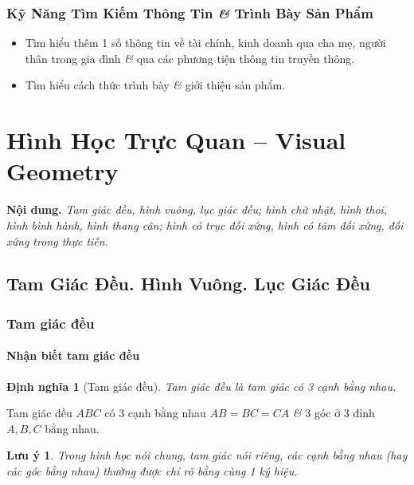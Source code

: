\documentclass{article}
\numberwithin{equation}{section}
\newtheorem{dinhnghia}{Định nghĩa}[section]
\newtheorem{luuy}{Lưu ý}[section]
\begin{document}
\subsubsection{Kỹ Năng Tìm Kiếm Thông Tin \textit{\&} Trình Bày Sản Phẩm}

\begin{itemize}
	\item Tìm hiểu thêm 1 số thông tin về tài chính, kinh doanh qua cha mẹ, người thân trong gia đình \textit{\&} qua các phương tiện thông tin truyền thông.
	\item Tìm hiểu cách thức trình bày \textit{\&} giới thiệu sản phẩm.
\end{itemize}


\section{Hình Học Trực Quan -- Visual Geometry}
\textbf{Nội dung.} \textit{Tam giác đều, hình vuông, lục giác đều; hình chữ nhật, hình thoi, hình bình hành, hình thang cân; hình có trục đối xứng, hình có tâm đối xứng, đối xứng trong thực tiễn}.

\subsection{Tam Giác Đều. Hình Vuông. Lục Giác Đều}

\subsubsection{Tam giác đều}

\paragraph{Nhận biết tam giác đều}
\begin{dinhnghia}[Tam giác đều]
	\emph{Tam giác đều} là tam giác có 3 cạnh bằng nhau.
\end{dinhnghia}
Tam giác đều $ABC$ có 3 cạnh bằng nhau $AB = BC = CA$ \textit{\&} 3 góc ở 3 đỉnh $A,B,C$ bằng nhau.

\begin{luuy}
	Trong hình học nói chung, tam giác nói riêng, các cạnh bằng nhau (hay các góc bằng nhau) thường được chỉ rõ bằng cùng 1 ký hiệu.
\end{luuy}
\end{document}

